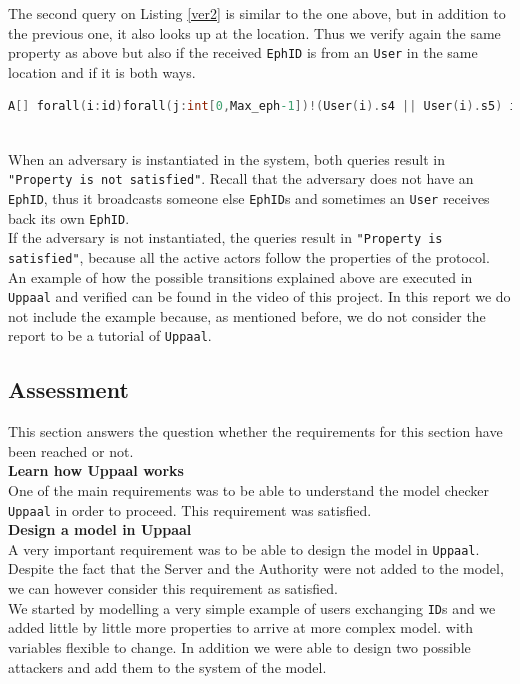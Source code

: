 \documentclass[a4paper, twocolumn]{article}
\begin{document}
\noindent The second query on Listing \ref{ver2} is similar to the one above, but in addition to the previous one, it also looks up at the location. Thus we verify again the same property as above but also if the received \texttt{EphID} is from an \texttt{User} in the same location and if it is both ways.
\begin{lstlisting}[language=C, caption= Strong Verifier,label={ver2}]
A[] forall(i:id)forall(j:int[0,Max_eph-1])!(User(i).s4 || User(i).s5) imply (User(i).r_token[j] imply(exists(k:int[0,numEph-1])(User(j/numEph+1).r_token[(i-1)*numEph+k]&&  User(i).r_loc[j] == User(j/numEph+1).r_loc[(i-1)*numEph+k])))
\end{lstlisting} \\

\noindent When an adversary is instantiated in the system, both queries result in \texttt{"Property is not satisfied"}. Recall that the adversary does not have an \texttt{EphID}, thus it broadcasts someone else \texttt{EphID}s and sometimes an \texttt{User} receives back its own \texttt{EphID}.\\
If the adversary is not instantiated, the queries result in \texttt{"Property is satisfied"}, because all the active actors follow the properties of the protocol.\\

\noindent An example of how the possible transitions explained above are executed in \texttt{Uppaal} and verified can be found in the video of this project. In this report we do not include the example because, as mentioned before, we do not consider the report to be a tutorial of \texttt{Uppaal}.
\subsection{Assessment}
This section answers the question whether the requirements for this section have been reached or not.\\

\noindent\textbf{Learn how Uppaal works}\\
One of the main requirements was to be able to understand the model checker \texttt{Uppaal} in order to proceed. This requirement was satisfied.\\

\noindent\textbf{Design a model in Uppaal}\\
A very important requirement was to be able to design the model in \texttt{Uppaal}. Despite the fact that the Server and the Authority were not added to the model, we can however consider this requirement as satisfied.\\
We started by modelling a very simple example of users exchanging \texttt{ID}s and we added little by little more properties to arrive at more complex model. with variables flexible to change. In addition we were able to design two possible attackers and add them to the system of the model.\\
\end{document}
